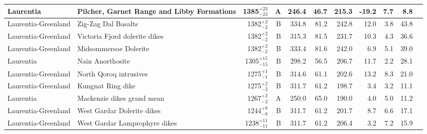 \documentclass[twocolumn, switch]{article} %
\begin{document}
{\begin{landscape}
\begin{ThreePartTable}
\begin{longtable}{p{1.4 in}p{1.2 in}rrrrrrrrp{1.2 in}}
                     Laurentia &         Pilcher, Garnet Range and Libby Formations &   1385$^{+23}_{-23}$ &      A &     246.4 &      46.7 & 215.3 & -19.2 &       7.7 &         8.8 &                                 \cite{Elston2002a} \\ \hline
           Laurentia-Greenland &                                Zig-Zag Dal Basalts &     1382$^{+2}_{-2}$ &      B &     334.8 &      81.2 & 242.8 &  12.0 &       3.8 &        43.8 &                              \cite{Marcussen1983a} \\ \hline
           Laurentia-Greenland &                      Victoria Fjord dolerite dikes &     1382$^{+2}_{-2}$ &      B &     315.3 &      81.5 & 231.7 &  10.3 &       4.3 &        36.6 &                             \cite{Abrahamsen1987a} \\ \hline
           Laurentia-Greenland &                              Midsommersoe Dolerite &     1382$^{+2}_{-2}$ &      B &     333.4 &      81.6 & 242.0 &   6.9 &       5.1 &        39.0 &                              \cite{Marcussen1983a} \\ \hline
                     Laurentia &                                   Nain Anorthosite &   1305$^{+15}_{-15}$ &      B &     298.2 &      56.5 & 206.7 &  11.7 &       2.2 &        28.1 &                                 \cite{Murthy1978a} \\ \hline
           Laurentia-Greenland &                             North Qoroq intrusives &     1275$^{+1}_{-1}$ &      B &     314.6 &      61.1 & 202.6 &  13.2 &       8.3 &        21.0 &                                  \cite{Piper1992a} \\ \hline
           Laurentia-Greenland &                                  Kungnat Ring dike &     1275$^{+2}_{-2}$ &      B &     311.7 &      61.2 & 198.7 &   3.4 &       3.2 &        11.1 &                                  \cite{Piper1977b} \\ \hline
                     Laurentia &                         Mackenzie dikes grand mean &     1267$^{+2}_{-2}$ &      A &     250.0 &      65.0 & 190.0 &   4.0 &       5.0 &        11.2 &                                 \cite{Buchan2000a} \\ \hline
           Laurentia-Greenland &                         West Gardar Dolerite dikes &     1244$^{+8}_{-8}$ &      B &     311.7 &      61.2 & 201.7 &   8.7 &       6.6 &        17.1 &                                  \cite{Piper1977b} \\ \hline
           Laurentia-Greenland &                      West Gardar Lamprophyre dikes &   1238$^{+11}_{-11}$ &      B &     311.7 &      61.2 & 206.4 &   3.2 &       7.2 &        15.9 &                                  \cite{Piper1977b} \\ \hline

\end{longtable}
\end{ThreePartTable}
\end{landscape}}
\end{document}
